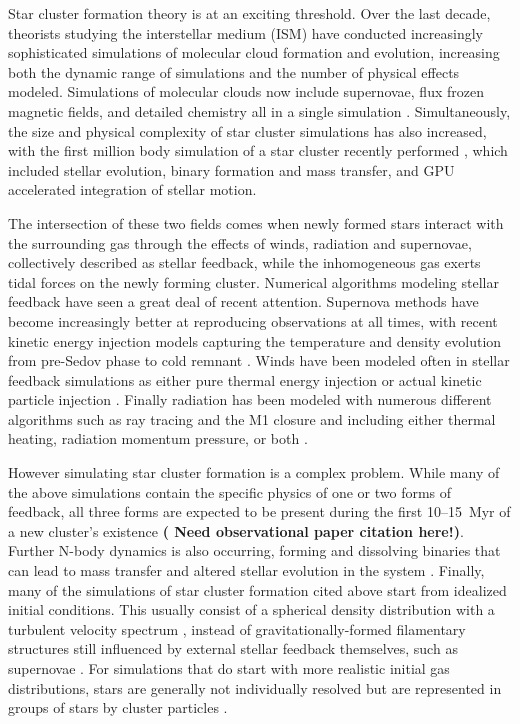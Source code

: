 \documentclass[11pt]{article}
\begin{document}
Star cluster formation theory is at an exciting threshold. Over the last decade, theorists studying the interstellar medium (ISM) have conducted increasingly sophisticated simulations of molecular cloud formation and evolution, increasing both the dynamic range of simulations and the number of physical effects modeled. Simulations of molecular clouds now include supernovae, flux frozen magnetic fields, and detailed chemistry all in a single simulation \citep{Klessen_2000_GasDynTurb,Mac_Low_Star_Formation,Joung2006,Hill2012,Ibanez-Mejia2016,haid_supernova-blast_2016,Walch_SILLC1}. Simultaneously, the size and physical complexity of star cluster simulations has also increased, with the first million body simulation of a star cluster recently performed \citep{Dragon_Wang}, which included stellar evolution, binary formation and mass transfer, and GPU accelerated integration of stellar motion. 

The intersection of these two fields comes when newly formed stars interact with the surrounding gas through the effects of winds, radiation and supernovae, collectively described as stellar feedback, while the inhomogeneous gas exerts tidal forces on the newly forming cluster. Numerical algorithms modeling stellar feedback have seen a great deal of recent attention. Supernova methods have become increasingly better at reproducing observations at all times, with recent kinetic energy injection models capturing the temperature and density evolution from pre-Sedov phase to cold remnant \citep{Simpson2015,Kim_Ostriker_2015ApJ}. Winds have been modeled often in stellar feedback simulations as either pure thermal energy injection or actual kinetic particle injection \citep{Pelupessy_embedded_SC,Dale_winds_2013}. Finally radiation has been modeled with numerous different algorithms such as ray tracing and the M1 closure and including either thermal heating, radiation momentum pressure, or both \citep{Dale_Winds_and_H2,WiseAbel2011,RAMSES-RT,Raskutti_Ostriker_2016}.

However simulating star cluster formation is a complex problem. While many of the above simulations contain the specific physics of one or two forms of feedback, all three forms are expected to be present during the first 10--15~Myr %
of a new cluster's existence {\bf( Need observational paper citation here!)}. Further N-body dynamics is also occurring, forming and dissolving binaries that can lead to mass transfer and altered stellar evolution in the system \citep{PortegiesZwart2007}. Finally, many of the simulations of star cluster formation cited above start from idealized initial conditions. This usually consist of a spherical density distribution with a turbulent velocity spectrum \citep{Dale_Winds_and_H2,Raskutti_Ostriker_2016}, instead of gravitationally-formed filamentary structures \citep{Ibanez-Mejia2016} still influenced by external stellar feedback themselves, such as supernovae \citep{Hill2012}. For simulations that do start with more realistic initial gas distributions, stars are generally not individually resolved but are represented in groups of stars by cluster particles \citep{Gatto_Walch_SILCC3_2016,dobbs_properties_2016}.
\end{document}
